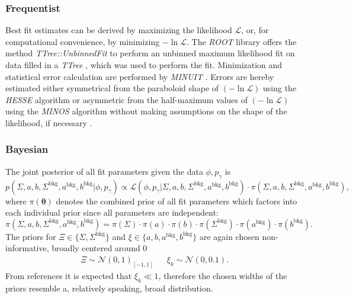 \subsubsection{Frequentist}
Best fit estimates can be derived by maximizing the likelihood $\mathcal{L}$, or, for computational convenience, by minimizing $-\ln\mathcal{L}$. The \emph{ROOT} library \cite{root} offers the method \emph{TTree::UnbinnedFit} to perform an unbinned maximum likelihood fit on data filled in a \emph{TTree} \cite{runbinnedFit}, which was used to perform the fit. Minimization and statistical error calculation are performed by \emph{MINUIT} \cite{minuit}. Errors are hereby estimated either symmetrical from the paraboloid shape of $(-\ln\mathcal{L})$ using the \emph{HESSE} algorithm or asymmetric from the half-maximum values of $(-\ln\mathcal{L})$ using the \emph{MINOS} algorithm without making assumptions on the shape of the likelihood, if necessary \cite{minuit}.  
\subsubsection{Bayesian}
The joint posterior of all fit parameters given the data $\phi,p_\gamma$ is 
\begin{equation}
	p\left(\Sigma,a,b,\Sigma^\text{bkg},a^\text{bkg},b^\text{bkg}\big|\phi,p_\gamma\right)\propto \mathcal{L}\left(\phi,p_\gamma\big|\Sigma,a,b,\Sigma^\text{bkg},a^\text{bkg},b^\text{bkg}\right)\cdot\pi\left(\Sigma,a,b,\Sigma^\text{bkg},a^\text{bkg},b^\text{bkg}\right),
\end{equation}
where $\pi(\boldsymbol{\theta})$ denotes the combined prior of all fit parameters which factors into each individual prior since all parameters are independent:
\begin{equation}
	\pi\left(\Sigma,a,b,\Sigma^\text{bkg},a^\text{bkg},b^\text{bkg}\right)=\pi\left(\Sigma\right)\cdot\pi\left(a\right)\cdot\pi\left(b\right)\cdot\pi\left(\Sigma^\text{bkg}\right)\cdot\pi\left(a^\text{bkg}\right)\cdot\pi\left(b^\text{bkg}\right).
\end{equation}
The priors for $\Xi\in\{\Sigma,\Sigma^\text{bkg}\}$ and $\xi\in\{a,b,a^\text{bkg},b^\text{bkg}\}$ are again chosen non-informative, broadly centered around 0
\begin{align}
	\Xi\sim\mathcal{N}(0,1)_{[-1,1]} &&\xi_k\sim\mathcal{N}(0,0.1).
	\label{eq:priors}
\end{align}
 From references \cite{farahphd,hartmannphd} it  is expected that $\xi_k\ll1$, therefore the chosen widths of the priors resemble a, relatively speaking, broad distribution. 
 

